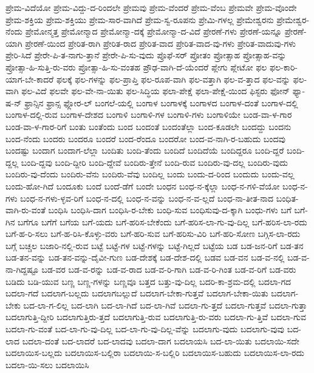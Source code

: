 {ಪ್ರೇಮ-ವಿದೆಯೋ
ಪ್ರೇಮ-ವಿದ್ದು-ದ-ರಿಂದಲೇ
ಪ್ರೇಮವು
ಪ್ರೇಮ-ವೆಂದರೆ
ಪ್ರೇಮ-ವೆಂಬ
ಪ್ರೇಮವೇ
ಪ್ರೇಮ-ವೊಂದೇ
ಪ್ರೇಮ-ಶಕ್ತಿಯ
ಪ್ರೇಮ-ಶಕ್ತಿಯು
ಪ್ರೇಮ-ಸಾರ-ವಾಗಿದೆ
ಪ್ರೇಮ-ಸ್ವ-ರೂಪನು
ಪ್ರೇಮಿ-ಗಳಲ್ಲ
ಪ್ರೇಮೇಶ್ವರನು
ಪ್ರೇಮೇಶ್ವರ-ನೆಂದು
ಪ್ರೇಮೋನ್ಮತ್ತ
ಪ್ರೇಮೋನ್ಮಾದ
ಪ್ರೇಮೋನ್ಮಾ-ದಕ್ಕೆ
ಪ್ರೇಮೋನ್ಮಾ-ದ-ವಿದೆ
ಪ್ರೇರಣೆ-ಗಳು
ಪ್ರೇರಣೆ-ಯನ್ನೂ
ಪ್ರೇರಣೆ-ಯಾಗಿ
ಪ್ರೇರಣೆ-ಯಿಂದ
ಪ್ರೇರಿತ-ರಾಗಿ
ಪ್ರೇರಿತ-ರಾದ
ಪ್ರೇರಿತ-ವಾದ
ಪ್ರೇರಿತ-ವಾದ-ವು-ಗಳು
ಪ್ರೇರಿತ-ವಾದುವು-ಗಳು
ಪ್ರೇರಿ-ಸಿದೆ
ಪ್ರೇರೇ-ಪಿ-ತ-ನಾಗು-ತ್ತಾನೆ
ಪ್ರೇರೇ-ಪಿ-ಸು-ವುದು
ಪ್ರೊಫೆ-ಸರ್
ಪ್ರೋತಂ
ಪ್ರೋತ್ಸಾಹ
ಪ್ರೋತ್ಸಾಹ-ವನ್ನು
ಪ್ರೋತ್ಸಾ-ಹಿ-ಸುತ್ತಿ-ರು-ವರು
ಪ್ರೋತ್ಸಾ-ಹಿ-ಸು-ವಂತಹ
ಪ್ರೌಢ-ವಾಗಿ-ದೆ-ಯೆಂದರೆ
ಪ್ಲೇಗು
ಪ್ಲೇಟೋ
ಫಲ
ಫಲ-ಕಾರಿ-ಯಾಗ-ಬೇ-ಕಾದರೆ
ಫಲಕ್ಕೆ
ಫಲ-ಗಳನ್ನು
ಫಲ-ಪ್ರಾಪ್ತಿ
ಫಲ-ರೂಪ-ವಾಗಿ
ಫಲ-ವತ್ತಾಗಿ
ಫಲ-ವ-ತ್ತಾದ
ಫಲ-ವನ್ನು
ಫಲ-ವಾಗಿ
ಫಲ-ವಿದೆ
ಫಲವೇ
ಫಲ-ವೇ-ನಾ-ಯಿತು
ಫಲ-ಸಿದ್ಧಿಯ
ಫಲಾ-ಪೇಕ್ಷೆ
ಫಲಾ-ಪೇಕ್ಷೆ-ಯಿಂದ
ಫಿಸ್ಟರು
ಫೋನ್
ಫ್ಯಾ-ಷ-ನ್
ಫ್ರಾನ್ಸಿನ
ಫ್ರಾನ್ಸ
ಫ್ಲೋರ-ಲ್
ಬಂಗಲೆ-ಯಲ್ಲಿ
ಬಂಗಾಳ
ಬಂಗಾಳಕ್ಕೆ
ಬಂಗಾಳದ
ಬಂಗಾಳ-ದಂತೆ
ಬಂಗಾಳ-ದಲ್ಲಿ
ಬಂಗಾಳ-ದಲ್ಲಿ-ರುವ
ಬಂಗಾಳ-ದೇಶದ
ಬಂಗಾಳಿ
ಬಂಗಾಳಿ-ಗಳ
ಬಂಗಾಳಿ-ಗಳು
ಬಂಗಾಳಿಯೇ
ಬಂಡ-ವಾ-ಳ-ಗಾರ
ಬಂಡ-ವಾ-ಳ-ಗಾರ-ರಿಗೆ
ಬಂತು
ಬಂತೆಂದು
ಬಂದ
ಬಂದಂತೆ
ಬಂದಂತೆಲ್ಲಾ
ಬಂದ-ಕೂಡಲೇ
ಬಂದದ್ದು
ಬಂದನು
ಬಂದ-ನೆಂದು
ಬಂದರು
ಬಂದರೂ
ಬಂದರೆ
ಬಂದ-ರೆಂದೂ
ಬಂದರೋ
ಬಂದ-ವ-ನಾಗಿ-ರ-ಬಹುದು
ಬಂದವು
ಬಂದಷ್ಟು
ಬಂದಾಗ
ಬಂದಾಗ-ಲೆಲ್ಲಾ
ಬಂದಿತು
ಬಂದಿ-ತೆಂದು
ಬಂದಿದೆ
ಬಂದಿದೆಯೆ
ಬಂದಿದ್ದರೂ
ಬಂದಿ-ದ್ದರೆ
ಬಂದಿ-ದ್ದಲ್ಲ
ಬಂದಿ-ದ್ದವು
ಬಂದಿ-ದ್ದೀರಿ
ಬಂದಿ-ದ್ದೇವೆ
ಬಂದಿರು-ತ್ತೇನೆ
ಬಂದಿ-ರುವ
ಬಂದಿರು-ವು-ದಲ್ಲ
ಬಂದಿರು-ವುದು
ಬಂದಿರು-ವು-ದೆಂದು
ಬಂದಿರು-ವೆನು
ಬಂದಿರು-ವೆವು
ಬಂದಿಲ್ಲ
ಬಂದು
ಬಂದು-ದ-ರಿಂದ
ಬಂದುದು
ಬಂದು-ವಲ್ಲ
ಬಂದು-ಹೋ-ಗಿದೆ
ಬಂದೂಕು
ಬಂದೆ
ಬಂದೆ-ಡೆಗೆ
ಬಂದೇ
ಬಂಧನ
ಬಂಧ-ನ-ಕ್ಕೆಲ್ಲಾ
ಬಂಧ-ನ-ಗಳಿ-ವೆಯೋ
ಬಂಧ-ನ-ಗಳು
ಬಂಧ-ನ-ಗಳು-ಳ್ಳವ-ರಿಗೆ
ಬಂಧ-ನ-ದಲ್ಲಿ
ಬಂಧ-ನ-ವನ್ನು
ಬಂಧ-ನ-ವ-ಲ್ಲದೆ
ಬಂಧ-ನಾ-ತೀತ-ನಾದ
ಬಂಧಿತ-ವಾಗಿ-ರು-ವಂತೆ
ಬಂಧಿಸಿ
ಬಂಧಿಸಿ-ದಾಗ
ಬಂಧಿಸಿ-ರ-ಬೇಕು
ಬಂಧಿ-ಸುವ
ಬಂಧಿಸುವು-ದ-ಕ್ಕಾಗಿ
ಬಂಧು-ಗಳು
ಬಗೆ
ಬಗೆ-ಗಿನ
ಬಗೆಗೂ
ಬಗೆಗೆ
ಬಗೆಯ
ಬಗೆ-ಯದು
ಬಗೆ-ಹರಿಸ-ಬೇಕೆಂದು
ಬಗೆ-ಹರಿಸ-ಲಾ-ಗು-ವು-ದಿಲ್ಲ
ಬಗೆ-ಹರಿಸ-ಲಾ-ರದು
ಬಗೆ-ಹ-ರಿ-ಸಲು
ಬಗೆ-ಹ-ರಿಸಿ-ಕೊಳ್ಳು-ವರು
ಬಗೆ-ಹರಿ-ಸುವ
ಬಗೆ-ಹರಿಸು-ವಿರಿ
ಬಗೆ-ಹರಿ-ಸೋಣ
ಬಗ್ಗಿಸ-ಲಾ-ರದು
ಬಗ್ಗೆ
ಬಚ್ಚಲ
ಬಜಾರಿ-ನಲ್ಲಿ-ರುವ
ಬಟ್ಟೆ
ಬಟ್ಟೆ-ಗಳ
ಬಟ್ಟೆ-ಗಳನ್ನು
ಬಟ್ಟೆ-ಗಿಲ್ಲದೆ
ಬಟ್ಟೆಯ
ಬಡ
ಬಡ-ಜನ-ರಿಗೆ
ಬಡ-ತನ
ಬಡ-ತನ-ವನ್ನು
ಬಡ-ತನ-ವನ್ನು-ದೈವೀ-ಗುಣ
ಬಡ-ದೇಶಕ್ಕೆ
ಬಡ-ದೇಶ-ದಲ್ಲಿ
ಬಡವ
ಬಡ-ವನ
ಬಡ-ವ-ನಲ್ಲಿ
ಬಡ-ವ-ನಾ-ಗಿದ್ದಷ್ಟೂ
ಬಡ-ವರ
ಬಡ-ವ-ರನ್ನು
ಬಡ-ವ-ರಾದ
ಬಡ-ವ-ರಿ-ಗಾಗಿ
ಬಡ-ವ-ರಿ-ಗಿಂತ
ಬಡ-ವ-ರಿಗೆ
ಬಡ-ವರು
ಬಡಿದು
ಬಡಿ-ಯುವ
ಬಣ್ಣ
ಬಣ್ಣ-ಗಳನ್ನು
ಬಣ್ಣವೂ
ಬತ್ತದ
ಬತ್ತು-ವು-ದಿಲ್ಲ
ಬದರಿ-ಕಾ-ಶ್ರಮ-ದಲ್ಲಿ
ಬದಲಾ-ಗದ
ಬದಲಾ-ಗದೆ
ಬದಲಾಗ-ಬಲ್ಲದು
ಬದಲಾಗಬಲ್ಲುದೆ
ಬದಲಾಗ-ಬೇಕಾ-ಗುತ್ತವೆ
ಬದಲಾಗ-ಬೇಕಾ-ಯಿತು
ಬದಲಾಗ-ಬೇಕು
ಬದ-ಲಾ-ಗ-ಲಿಲ್ಲ
ಬದ-ಲಾಗಿ
ಬದ-ಲಾ-ಗಿದೆ
ಬದ-ಲಾ-ಗಿವೆ
ಬದಲಾ-ಗು-ತ್ತದೆ
ಬದಲಾ-ಗುತ್ತವೆ
ಬದಲಾ-ಗುತ್ತಾ
ಬದಲಾಗುತ್ತಿ-ದ್ದೀರಿ
ಬದಲಾಗುತ್ತಿರು-ತ್ತದೆ
ಬದಲಾಗುತ್ತಿ-ರುವ
ಬದಲಾಗುತ್ತಿ-ರು-ವರು
ಬದಲಾ-ಗು-ತ್ತಿವೆ
ಬದಲಾ-ಗುವ
ಬದಲಾ-ಗು-ವಂತೆ
ಬದ-ಲಾ-ಗು-ವು-ದಿಲ್ಲ
ಬದ-ಲಾ-ಗು-ವು-ದಿಲ್ಲ-ವೆನ್ನು
ಬದಲಾಗು-ವುದು
ಬದಲಾಗು-ವುವು
ಬದ-ಲಾದ
ಬದಲಾ-ದಂತೆ
ಬದ-ಲಾದರೆ
ಬದ-ಲಾದವು
ಬದಲಾ-ದಾಗ
ಬದಲಾಯಸಿ
ಬದ-ಲಾ-ಯಿತು
ಬದಲಾಯಿ-ಸದೇ
ಬದಲಾಯಿಸ-ಬಲ್ಲದು
ಬದಲಾಯಿಸ-ಬಲ್ಲಿರಾ
ಬದಲಾಯಿ-ಸ-ಬಲ್ಲಿರಿ
ಬದಲಾಯಿಸ-ಬಹುದು
ಬದಲಾಯಿಸ-ಲಾ-ರದು
ಬದಲಾ-ಯಿ-ಸಲು
ಬದಲಾಯಿಸಿ
}
